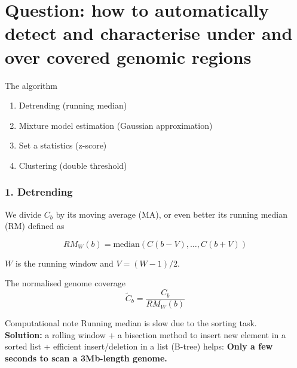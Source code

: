 \documentclass{beamer}
\begin{document}
\section{
Question: how to automatically detect and characterise under and 
over covered genomic regions}



\begin{frame}{The algorithm}
  \begin{enumerate}
    \item Detrending (running median)
    \item Mixture model estimation (Gaussian approximation)
    \item Set a statistics (z-score)
    \item Clustering (double threshold)
  \end{enumerate}
\end{frame}


\begin{frame}
\frametitle{1. Detrending}
 
We divide $C_b$ by its moving average (MA), or even better its 
running median (RM) defined as 

\begin{equation}
RM_W(b) = \textrm{median}\left({C(b-V), \dots , C(b+V)}\right) \nonumber
\end{equation}

$W$ is the running window and $V=(W-1)/2$.

\begin{block}{The normalised genome coverage}
\begin{equation}
\widetilde{C}_b = \frac{C_b}{RM_W(b)}  \nonumber
\end{equation}
\end{block}

\pause

\begin{block}{Computational note}
Running median is slow due to the sorting task. \\
\textbf{Solution:} a rolling window + a bisection method to insert 
new element in a sorted list + efficient insert/deletion in a 
list (B-tree) helps:  \textbf{Only a few seconds to scan a 3Mb-length genome.}
\end{block} 
\end{frame}
\end{document}
